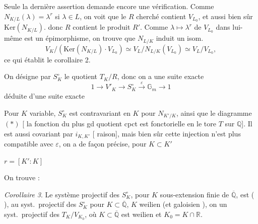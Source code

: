 \documentclass[11pt,a4paper]{article}
\begin{document}
Seule la dernière assertion demande encore une vérification. Comme
$N_{K/L}(\lambda) = \lambda^{r}$ si $\lambda \in L$, on voit que le $R$
cherché contient $V_{L_{0}}$, et aussi bien sûr $\mathrm{Ker}(N_{K/L})$.
 donc $R$ contient le produit $R'$.  Comme
 $\lambda \mapsto \lambda^{r}$ de $V_{L_{0}}$ dans lui-même
est un épimorphisme, on trouve que $N_{L/K}$ induit un isom.
\[
  V_{K} / (\mathrm{Ker}(N_{K/L}) \cdot V_{L_{0}}) \simeq
  V_{L} / N_{L/K}(V_{L_{0}}) \simeq V_{L}/V_{L_{0}} ,
\]
ce qui établit le corollaire 2.

On désigne par $S^{\circ}_{K}$ le quotient $T_{K}/R$, donc on a une suite
exacte
\[
  1 \longrightarrow V'_{K} \longrightarrow S^{\circ}_{K}
  \xrightarrow{\;\varepsilon\;} \mathbb{G}_{m} \longrightarrow 1
\]
déduite d'une suite exacte


\marginal{$(*)$}

Pour $K$ variable, $S^{\circ}_{K}$ est contravariant en $K$ pour
$N_{K'/K}$, ainsi que le diagramme $(*)$ [\struck{\ill{}} la fonction du
plus gd quotient cpct est fonctorielle en le tore $T$ sur $\mathbb{Q}$]. Il
est aussi covariant \struck{\ill{}} par $i_{K,K'}$ [
raison], mais bien sûr cette injection n'est plus compatible avec
$\varepsilon$, on a de façon précise, pour $K \subset K'$



\marginal{$(**)$}
$r = [K' : K]$

On trouve :

\emph{Corollaire 3}. Le système projectif des $S^{\circ}_{K}$, pour $K$
sous-extension finie de $\overline{\mathbb{Q}}$, est 
\ill{} (\ill{} \ill{}),  au syst.\ projectif des
$S^{\circ}_{K}$ pour $K \subset \overline{\mathbb{Q}}$, $K$ weilien (et
galoisien \ill{}), on  un syst.\ projectif des
 $T_{K}/V_{K_{0}}$, où $K \subset \overline{\mathbb{Q}}$ est
weilien et $K_{0} = K \cap \mathbb{R}$.
\end{document}
